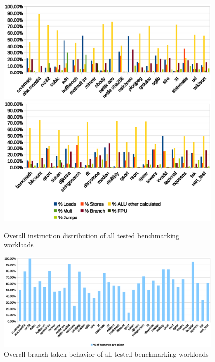\documentclass[../bachelor_paper.tex]{subfiles}
\begin{document}
\begin{figure}
    \centering
    \includegraphics[width=\textwidth]{img/graph/overall_inst_dist}
    \includegraphics[width=\textwidth]{img/graph/overall_inst_dist2}
    \caption{Overall instruction distribution of all tested benchmarking workloads}
    \label{fig:res/overall/inst}
\end{figure}

\begin{figure}
    \centering
    \includegraphics[width=\textwidth]{img/graph/overall_branch_tk.eps}
    \caption{Overall branch taken behavior of all tested benchmarking workloads}
    \label{fig:res/overall/branch_tk}
\end{figure}
\end{document}
